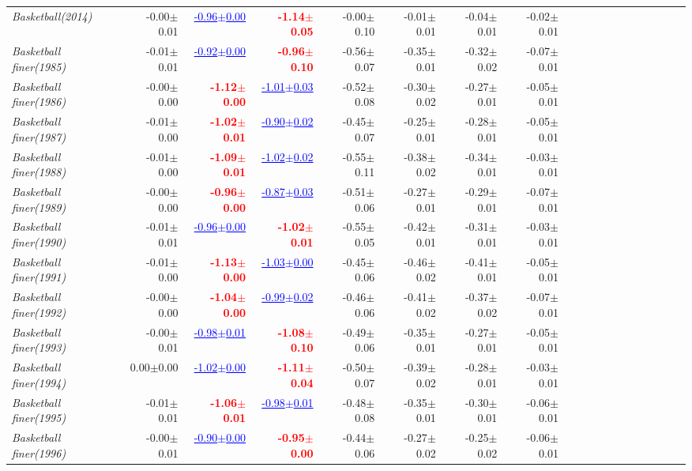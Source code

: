\documentclass[nohyperref]{article}
\theoremstyle{plain}
\theoremstyle{definition}
\theoremstyle{remark}
\newcommand{\red}[1]{\textcolor{red}{\textbf{#1}}}
\newcommand{\blue}[1]{\textcolor{blue}{\underline{#1}}}
\begin{document}
\begin{table*}[!ht]
{\begin{tabular}{lrrrrrrrrrrrrrrrrrr}
			{\it Basketball(2014)} & -0.00$\pm$0.01 & \blue{-0.96$\pm$0.00} & \red{-1.14$\pm$0.05} & -0.00$\pm$0.10 & -0.01$\pm$0.01 & -0.04$\pm$0.01 & -0.02$\pm$0.01 \\
			{\it Basketball finer(1985)} & -0.01$\pm$0.01 & \blue{-0.92$\pm$0.00} & \red{-0.96$\pm$0.10} & -0.56$\pm$0.07 & -0.35$\pm$0.01 & -0.32$\pm$0.02 & -0.07$\pm$0.01 \\
			{\it Basketball finer(1986)} & -0.00$\pm$0.00 & \red{-1.12$\pm$0.00} & \blue{-1.01$\pm$0.03} & -0.52$\pm$0.08 & -0.30$\pm$0.02 & -0.27$\pm$0.01 & -0.05$\pm$0.01 \\
			{\it Basketball finer(1987)} & -0.01$\pm$0.00 & \red{-1.02$\pm$0.01} & \blue{-0.90$\pm$0.02} & -0.45$\pm$0.07 & -0.25$\pm$0.01 & -0.28$\pm$0.01 & -0.05$\pm$0.01 \\
			{\it Basketball finer(1988)} & -0.01$\pm$0.00 & \red{-1.09$\pm$0.01} & \blue{-1.02$\pm$0.02} & -0.55$\pm$0.11 & -0.38$\pm$0.02 & -0.34$\pm$0.01 & -0.03$\pm$0.01 \\
			{\it Basketball finer(1989)} & -0.00$\pm$0.00 & \red{-0.96$\pm$0.00} & \blue{-0.87$\pm$0.03} & -0.51$\pm$0.06 & -0.27$\pm$0.01 & -0.29$\pm$0.01 & -0.07$\pm$0.01 \\
			{\it Basketball finer(1990)} & -0.01$\pm$0.01 & \blue{-0.96$\pm$0.00} & \red{-1.02$\pm$0.01} & -0.55$\pm$0.05 & -0.42$\pm$0.01 & -0.31$\pm$0.01 & -0.03$\pm$0.01 \\
			{\it Basketball finer(1991)} & -0.01$\pm$0.00 & \red{-1.13$\pm$0.00} & \blue{-1.03$\pm$0.00} & -0.45$\pm$0.06 & -0.46$\pm$0.02 & -0.41$\pm$0.01 & -0.05$\pm$0.01 \\
			{\it Basketball finer(1992)} & -0.00$\pm$0.00 & \red{-1.04$\pm$0.00} & \blue{-0.99$\pm$0.02} & -0.46$\pm$0.06 & -0.41$\pm$0.02 & -0.37$\pm$0.02 & -0.07$\pm$0.01 \\
			{\it Basketball finer(1993)} & -0.00$\pm$0.01 & \blue{-0.98$\pm$0.01} & \red{-1.08$\pm$0.10} & -0.49$\pm$0.06 & -0.35$\pm$0.01 & -0.27$\pm$0.01 & -0.05$\pm$0.01 \\
			{\it Basketball finer(1994)} & 0.00$\pm$0.00 & \blue{-1.02$\pm$0.00} & \red{-1.11$\pm$0.04} & -0.50$\pm$0.07 & -0.39$\pm$0.02 & -0.28$\pm$0.01 & -0.03$\pm$0.01 \\
			{\it Basketball finer(1995)} & -0.01$\pm$0.01 & \red{-1.06$\pm$0.01} & \blue{-0.98$\pm$0.01} & -0.48$\pm$0.08 & -0.35$\pm$0.01 & -0.30$\pm$0.01 & -0.06$\pm$0.01 \\
			{\it Basketball finer(1996)} & -0.00$\pm$0.01 & \blue{-0.90$\pm$0.00} & \red{-0.95$\pm$0.00} & -0.44$\pm$0.06 & -0.27$\pm$0.02 & -0.25$\pm$0.02 & -0.06$\pm$0.01 \\

\end{tabular}}
\end{table*}
\end{document}
